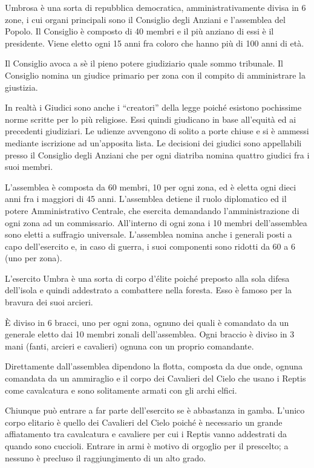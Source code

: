 \Politica Umbrosa \`e una sorta di repubblica democratica,
amministrativamente divisa in 6 zone, i cui organi principali sono il
Consiglio degli Anziani e l'assemblea del Popolo.  Il Consiglio \`e
composto di 40 membri e il pi\`u anziano di essi \`e il presidente.
Viene eletto ogni 15 anni fra coloro che hanno pi\`u di 100 anni di
et\`a.

Il Consiglio avoca a s\`e il pieno potere giudiziario quale sommo
tribunale. Il Consiglio nomina un giudice primario per zona con il
compito di amministrare la giustizia.  

In realt\`a i Giudici sono anche i ``creatori'' della legge poich\'e
esistono pochissime norme scritte per lo pi\`u religiose. Essi quindi
giudicano in base all'equit\`a ed ai precedenti giudiziari. 
Le udienze avvengono di solito a porte chiuse e si \`e ammessi
mediante iscrizione ad un'apposita lista. Le decisioni dei giudici
sono appellabili presso il Consiglio degli Anziani che per ogni
diatriba nomina quattro giudici fra i suoi membri.

L'assemblea \`e composta da 60 membri, 10 per ogni zona, ed \`e eletta
ogni dieci anni fra i maggiori di 45 anni. L'assemblea detiene il ruolo
diplomatico ed il potere Amministrativo Centrale, che esercita demandando 
l'amministrazione di ogni zona ad un commissario.
All'interno di ogni zona i 10 membri dell'assemblea sono eletti a
suffragio universale. L'assemblea nomina anche i generali posti a capo
dell'esercito e, in caso di guerra, i suoi componenti sono ridotti da
60 a 6 (uno per zona).

\Esercito L'esercito Umbra \`e una sorta di corpo d'\'elite poich\'e
preposto alla sola difesa dell'isola e quindi addestrato a combattere
nella foresta.  Esso \`e famoso per la bravura dei suoi arcieri.

\`E diviso in 6 bracci, uno per ogni zona, ognuno dei quali \`e
comandato da un generale eletto dai 10 membri zonali dell'assemblea.
Ogni braccio \`e diviso in 3 mani (fanti, arcieri e cavalieri) ognuna
con un proprio comandante.

Direttamente dall'assemblea dipendono la flotta, composta da due
onde, ognuna comandata da un ammiraglio e il corpo dei Cavalieri del
Cielo che usano i Reptis come cavalcatura e sono solitamente armati
con gli archi elfici.

Chiunque pu\`o entrare a far parte dell'esercito se \`e abbastanza
in gamba. L'unico corpo elitario \`e quello dei Cavalieri del Cielo
poich\'e \`e necessario un grande affiatamento tra cavalcatura e
cavaliere per cui i Reptis vanno addestrati da quando sono cuccioli.
Entrare in armi \`e motivo di orgoglio per il prescelto; a nessuno
\`e precluso il raggiungimento di un alto grado.

